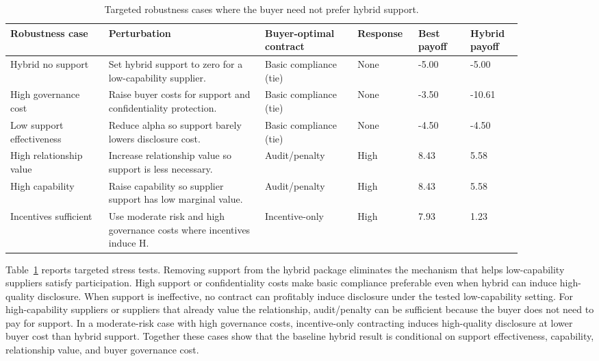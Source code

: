 \documentclass[final,5p,times,authoryear]{elsarticle}
\begin{document}
\begin{table}[t]
\centering
\begingroup
\setlength{\tabcolsep}{3pt}
\small
\caption{Targeted robustness cases where the buyer need not prefer hybrid support.}
\label{tab:targeted_robustness}
\begin{tabular}{@{}p{0.17\linewidth}p{0.27\linewidth}p{0.16\linewidth}p{0.09\linewidth}p{0.09\linewidth}p{0.09\linewidth}@{}}
\toprule
Robustness case & Perturbation & Buyer-optimal contract & Response & Best payoff & Hybrid payoff \\
\midrule
Hybrid no support & Set hybrid support to zero for a low-capability supplier. & Basic compliance (tie) & None & -5.00 & -5.00 \\
High governance cost & Raise buyer costs for support and confidentiality protection. & Basic compliance (tie) & None & -3.50 & -10.61 \\
Low support effectiveness & Reduce alpha so support barely lowers disclosure cost. & Basic compliance (tie) & None & -4.50 & -4.50 \\
High relationship value & Increase relationship value so support is less necessary. & Audit/penalty & High & 8.43 & 5.58 \\
High capability & Raise capability so supplier support has low marginal value. & Audit/penalty & High & 8.43 & 5.58 \\
Incentives sufficient & Use moderate risk and high governance costs where incentives induce H. & Incentive-only & High & 7.93 & 1.23 \\
\bottomrule
\end{tabular}
\endgroup
\end{table}
\FloatBarrier

Table~\ref{tab:targeted_robustness} reports targeted stress tests. Removing support from the hybrid package eliminates the mechanism that helps low-capability suppliers satisfy participation. High support or confidentiality costs make basic compliance preferable even when hybrid can induce high-quality disclosure. When support is ineffective, no contract can profitably induce disclosure under the tested low-capability setting. For high-capability suppliers or suppliers that already value the relationship, audit/penalty can be sufficient because the buyer does not need to pay for support. In a moderate-risk case with high governance costs, incentive-only contracting induces high-quality disclosure at lower buyer cost than hybrid support. Together these cases show that the baseline hybrid result is conditional on support effectiveness, capability, relationship value, and buyer governance cost.
\end{document}
